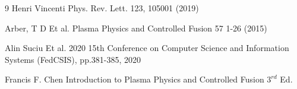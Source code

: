 \documentclass[12pt]{article}
\newenvironment{changemargin}[2]{%
\begin{list}{}{%
\setlength{\topsep}{0pt}%
\setlength{\leftmargin}{#1}%
\setlength{\rightmargin}{#2}%
\setlength{\listparindent}{\parindent}%
\setlength{\itemindent}{\parindent}%
\setlength{\parsep}{\parskip}%
}%
\item[]}{\end{list}}
\begin{document}
\begin{changemargin}{-3cm}{-3cm}
\begin{thebibliography}{9}
        Henri Vincenti Phys. Rev. Lett. 123, 105001 (2019)

        Arber, T D Et al. Plasma Physics and Controlled Fusion 57 1-26 (2015)

        Alin Suciu Et al. 2020 15th Conference on Computer Science and Information Systems (FedCSIS), pp.381-385, 2020

        Francis F. Chen
        Introduction to Plasma Physics and Controlled Fusion $3^{rd}$ Ed.

    \end{thebibliography}

\end{changemargin}
\end{document}
